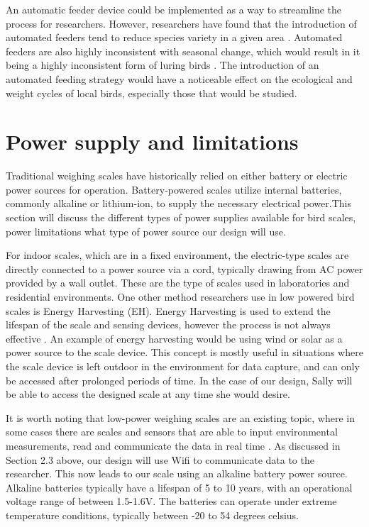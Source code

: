 \documentclass[class=report,11pt,crop=false]{standalone}
\begin{document}
An automatic feeder device could be implemented as a way to streamline the process for researchers. However, researchers have found that the introduction of automated feeders tend to reduce species variety in a given area \cite{GalbraithFeeders}. Automated feeders are also highly inconsistent with seasonal change, which would result in it being a highly inconsistent form of luring birds \cite{GalbraithFeeders}. The introduction of an automated feeding strategy would have a noticeable effect on the ecological and weight cycles of local birds, especially those that would be studied.

\section{Power supply and limitations}	
Traditional weighing scales have historically relied on either battery or electric power sources for operation. Battery-powered scales utilize internal batteries, commonly alkaline or lithium-ion, to supply the necessary electrical power.This section will discuss the different types of power supplies available for bird scales, power limitations what type of power source our design will use.

For indoor scales, which are in a fixed environment, the electric-type scales are directly connected to a power source via a cord, typically drawing from AC power provided by a wall outlet. These are the type of scales used in laboratories and residential environments. One other method researchers use in low powered bird scales is Energy Harvesting (EH). Energy Harvesting is used to extend the lifespan of the scale and sensing devices, however the process is not always effective \cite{EnergyHarvesting}. An example of energy harvesting would be using wind or solar as a power source to the scale device. This concept is mostly useful in situations where the scale device is left outdoor in the environment for data capture, and can only be accessed after prolonged periods of time. In the case of our design, Sally will be able to access the designed scale at any time she would desire.  

It is worth noting that low-power weighing scales are an existing topic, where in some cases there are scales and sensors that are able to input environmental measurements, read and communicate the data in real time \cite{ImageBased}. As discussed in Section 2.3 above, our design will use Wifi to communicate data to the researcher. This now leads to our scale using an alkaline battery power source. Alkaline batteries typically have a lifespan of 5 to 10 years, with an operational voltage range of between 1.5-1.6V. The batteries can operate under extreme temperature conditions, typically between -20 to 54 degrees celsius.
\end{document}
